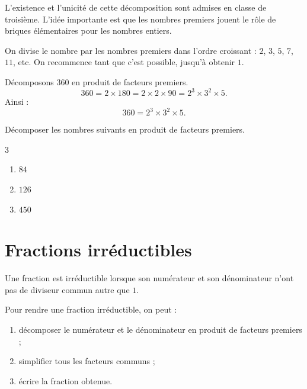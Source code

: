 \documentclass[a4paper,10pt]{report}
\begin{document}
\begin{demo}
L'existence et l'unicité de cette décomposition sont admises en classe de troisième.
L'idée importante est que les nombres premiers jouent le rôle de \og briques élémentaires \fg{} pour les nombres entiers.
\end{demo}

\begin{meth}
On divise le nombre par les nombres premiers dans l'ordre croissant : $2$, $3$, $5$, $7$, $11$, etc.
On recommence tant que c'est possible, jusqu'à obtenir $1$.
\end{meth}

\begin{ex}
Décomposons $360$ en produit de facteurs premiers.
\[
360=2\times 180
=2\times 2\times 90
=2^3\times 3^2\times 5.
\]
Ainsi :
\[
360=2^3\times 3^2\times 5.
\]
\end{ex}

\begin{ex}
Décomposer les nombres suivants en produit de facteurs premiers.

\begin{multicols}{3}
\begin{enumerate}
\item $84$
\item $126$
\item $450$
\end{enumerate}
\end{multicols}

\noindent\grandscarreaux{\linewidth}{4cm}
\end{ex}

\section{Fractions irréductibles}

\begin{defn}
Une fraction est irréductible lorsque son numérateur et son dénominateur n'ont pas de diviseur commun autre que $1$.
\end{defn}

\begin{meth}
Pour rendre une fraction irréductible, on peut :
\begin{enumerate}
\item décomposer le numérateur et le dénominateur en produit de facteurs premiers ;
\item simplifier tous les facteurs communs ;
\item écrire la fraction obtenue.
\end{enumerate}
\end{meth}
\end{document}
